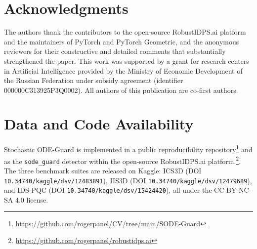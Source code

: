 \documentclass{ieeeaccess}
\begin{document}
\section*{Acknowledgments}
The authors thank the contributors to the open-source RobustIDPS.ai
platform and the maintainers of PyTorch and PyTorch Geometric, and the
anonymous reviewers for their constructive and detailed comments that
substantially strengthened the paper. This work was supported by a
grant for research centers in Artificial Intelligence provided by the
Ministry of Economic Development of the Russian Federation under
subsidy agreement (identifier 000000C313925P3Q0002). All authors of
this publication are co-first authors.

\section*{Data and Code Availability}
Stochastic ODE-Guard is implemented in a public reproducibility
repository\footnote{\url{https://github.com/rogerpanel/CV/tree/main/SODE-Guard}}
and as the \texttt{sode\_guard} detector within the open-source
RobustIDPS.ai platform.\footnote{\url{https://github.com/rogerpanel/robustidps.ai}}.
The three benchmark suites are released on Kaggle: ICS3D
(DOI \texttt{10.34740/kaggle/dsv/12483891}), IIS3D
(DOI \texttt{10.34740/kaggle/dsv/12479689}), and IDS-PQC
(DOI \texttt{10.34740/kaggle/dsv/15424420}), all under the CC BY-NC-SA
4.0 license.
\end{document}
